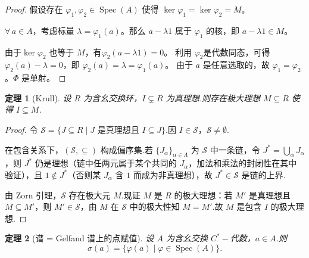 \documentclass{ctexart}
\newtheorem{theorem}{定理}[section]
\theoremstyle{plain}
\newtheorem*{proof}{证明}
\theoremstyle{plain}
\DeclareMathOperator{\Spec}{Spec}
\begin{document}
\begin{proof}
    
    假设存在 $\varphi_1, \varphi_2 \in \Spec(A)$ 使得 $\ker\varphi_1 = \ker\varphi_2 = M$。\par
    $\forall\, a \in A$，考虑标量 $\lambda = \varphi_1(a)$。那么 $a - \lambda 1$ 属于 $\varphi_1$ 的核，即 $a - \lambda 1 \in M$。\par
    由于$\ker\varphi_2$ 也等于 $M$，有$\varphi_2(a - \lambda 1) = 0$。
    利用 $\varphi_2$是代数同态，可得 $\varphi_2(a) - \lambda = 0$，即 $\varphi_2(a) = \lambda = \varphi_1(a)$。
    由于 $a$ 是任意选取的，故 $\varphi_1 = \varphi_2$。$\Phi$ 是单射。
\end{proof}

\begin{theorem}[Krull]\label{thm:krull}
    设 $R$ 为含幺交换环，$I \subsetneq R$ 为真理想.则存在极大理想 $M \subseteq R$ 使得 $I \subseteq M$.
\end{theorem}

\begin{proof}
    令 $\mathcal{S} = \{J \subseteq R \mid J \text{ 是真理想且 } I \subseteq J\}$.因 $I \in \mathcal{S}$，$\mathcal{S} \neq \emptyset$.\par
    在包含关系下，$(\mathcal{S}, \subseteq)$ 构成偏序集.若 $\{J_\alpha\}_{\alpha\in\Lambda}$ 为 $\mathcal{S}$ 中一条链，令 $J^* = \bigcup_{\alpha} J_\alpha$，则 $J^*$ 仍是理想（链中任两元属于某个共同的 $J_\alpha$，加法和乘法的封闭性在其中验证），且 $1 \notin J^*$（否则某 $J_\alpha$ 含 $1$ 而成为非真理想），故 $J^* \in \mathcal{S}$ 是链的上界.\par
    由 Zorn 引理，$\mathcal{S}$ 存在极大元 $M$.现证 $M$ 是 $R$ 的极大理想：若 $M'$ 是真理想且 $M \subseteq M'$，则 $M' \in \mathcal{S}$，由 $M$ 在 $\mathcal{S}$ 中的极大性知 $M = M'$.故 $M$ 是包含 $I$ 的极大理想.
\end{proof}


\begin{theorem}[谱 = Gelfand 谱上的点赋值]\label{thm:spectrum-range}
    设 $A$ 为含幺交换 $C^*-\!$代数，$a \in A$.则
    \begin{equation}\label{eq:spectrum-range}
        \boxed{\sigma(a) = \{\varphi(a) \mid \varphi \in \Spec(A)\}}.
    \end{equation}
\end{theorem}
\end{document}
